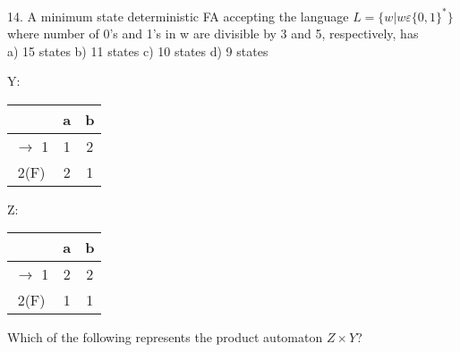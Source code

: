 \documentclass[9pt]{beamer}
\begin{document}
\begin{frame}
14. A minimum state deterministic FA accepting the language $L = \{w | w \varepsilon \{0, 1\}^{*}\}$ where number of
0’s and 1’s in w are divisible by 3 and 5, respectively, has\\

\vspace*{0.2cm}
\hspace{0.5cm}
a) 15 states  \hspace*{0.5cm}  b) 11 states  \hspace*{0.5cm}   c) 10 states  \hspace*{0.5cm}  d) 9 states \\
\vspace*{0.2cm}

\begin{multicols}{2}
Y:
\begin{center}
\begin{tabular}{|c|c|c|}

\hline
  & a & b \\
\hline
$\rightarrow$ 1 & 1 & 2 \\
\hline
2(F) & 2 & 1 \\
\hline

\end{tabular}
\end{center}


Z:
\begin{center}
\begin{tabular}{|c|c|c|}

\hline
  & a & b \\
\hline
$\rightarrow$ 1 & 2 & 2 \\
\hline
2(F) & 1 & 1 \\
\hline

\end{tabular}
\end{center}
\end{multicols}

\vspace*{0.2cm}

\hspace{0.5cm}
Which of the following represents the product automaton $Z \times Y$?\\

\vspace*{0.2cm}
\end{frame}
\end{document}
